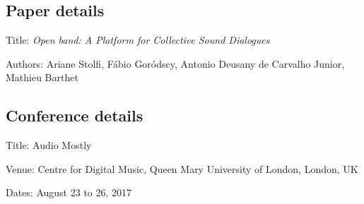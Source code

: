\subsection*{Paper details}

Title: \textit{Open band: A Platform for Collective Sound Dialogues}

Authors: Ariane Stolfi, Fábio Goródscy, Antonio Deusany de Carvalho Junior, Mathieu Barthet

\subsection*{Conference details}

Title: Audio Mostly

Venue: Centre for Digital Music, Queen Mary University of London, London, UK
 
Dates: August 23 to 26, 2017



